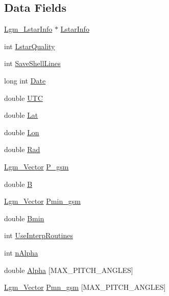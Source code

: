 \subsection*{Data Fields}
\begin{CompactItemize}
\item 
\hyperlink{struct_lgm___lstar_info}{Lgm\_\-LstarInfo} $\ast$ \hyperlink{struct_lgm___mag_ephem_info_e0b196f79d448339982446d78890b87f}{LstarInfo}
\item 
int \hyperlink{struct_lgm___mag_ephem_info_8a900c463a0e976afa63d5736adbe8df}{LstarQuality}
\item 
int \hyperlink{struct_lgm___mag_ephem_info_5e915118a580b5fdd3fc46cb0a09d618}{SaveShellLines}
\item 
long int \hyperlink{struct_lgm___mag_ephem_info_8c1b7b17183e48a6fafaf6302e1b1da9}{Date}
\item 
double \hyperlink{struct_lgm___mag_ephem_info_4eccefabe940625eb9277991aa138a38}{UTC}
\item 
double \hyperlink{struct_lgm___mag_ephem_info_0db4289c0b4f63b151634b17a1718879}{Lat}
\item 
double \hyperlink{struct_lgm___mag_ephem_info_19c0faefc29efbada475c057d15844d6}{Lon}
\item 
double \hyperlink{struct_lgm___mag_ephem_info_860bef50013f57ab1a6437b7986a9487}{Rad}
\item 
\hyperlink{struct_lgm___vector}{Lgm\_\-Vector} \hyperlink{struct_lgm___mag_ephem_info_8a1a3f856fc793f9b4289bbf1d4c7f2f}{P\_\-gsm}
\item 
double \hyperlink{struct_lgm___mag_ephem_info_df085adbf76beb194ac436d42cd1d725}{B}
\item 
\hyperlink{struct_lgm___vector}{Lgm\_\-Vector} \hyperlink{struct_lgm___mag_ephem_info_da6476a5f53c9e2d9ac6f1b1b28a37b3}{Pmin\_\-gsm}
\item 
double \hyperlink{struct_lgm___mag_ephem_info_2ac3a99381d281d4caabf024a33f0b31}{Bmin}
\item 
int \hyperlink{struct_lgm___mag_ephem_info_beeccfbf7295d0c631353a9159972a74}{UseInterpRoutines}
\item 
int \hyperlink{struct_lgm___mag_ephem_info_b434059765e60f2934e7de8fe5eb50db}{nAlpha}
\item 
double \hyperlink{struct_lgm___mag_ephem_info_0083768551a2459ebaafb84f97c4decd}{Alpha} \mbox{[}MAX\_\-PITCH\_\-ANGLES\mbox{]}
\item 
\hyperlink{struct_lgm___vector}{Lgm\_\-Vector} \hyperlink{struct_lgm___mag_ephem_info_07d64e5d5028ce92c07e7b9f8a62aed0}{Pmn\_\-gsm} \mbox{[}MAX\_\-PITCH\_\-ANGLES\mbox{]}

\end{CompactItemize}
